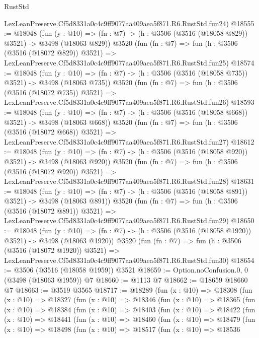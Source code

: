 \begin{lexlean}{RustStd}
\begin{coremodule}
    LexLeanPreserve.Cf5d8331a0c4c9ff9077aa409aea5f871.R6.RustStd.fun24)
@18555 := @18048
    (fun (y : @10) => (fn : @7) -> (h : @3506 (@3516 (@18058 @829)) @3521) -> @3498 (@18063 @829))
    @3520
    (fun (fn : @7) =>
    fun (h : @3506 (@3516 (@18072 @829)) @3521) =>
    LexLeanPreserve.Cf5d8331a0c4c9ff9077aa409aea5f871.R6.RustStd.fun25)
@18574 := @18048
    (fun (y : @10) => (fn : @7) -> (h : @3506 (@3516 (@18058 @735)) @3521) -> @3498 (@18063 @735))
    @3520
    (fun (fn : @7) =>
    fun (h : @3506 (@3516 (@18072 @735)) @3521) =>
    LexLeanPreserve.Cf5d8331a0c4c9ff9077aa409aea5f871.R6.RustStd.fun26)
@18593 := @18048
    (fun (y : @10) => (fn : @7) -> (h : @3506 (@3516 (@18058 @668)) @3521) -> @3498 (@18063 @668))
    @3520
    (fun (fn : @7) =>
    fun (h : @3506 (@3516 (@18072 @668)) @3521) =>
    LexLeanPreserve.Cf5d8331a0c4c9ff9077aa409aea5f871.R6.RustStd.fun27)
@18612 := @18048
    (fun (y : @10) => (fn : @7) -> (h : @3506 (@3516 (@18058 @920)) @3521) -> @3498 (@18063 @920))
    @3520
    (fun (fn : @7) =>
    fun (h : @3506 (@3516 (@18072 @920)) @3521) =>
    LexLeanPreserve.Cf5d8331a0c4c9ff9077aa409aea5f871.R6.RustStd.fun28)
@18631 := @18048
    (fun (y : @10) => (fn : @7) -> (h : @3506 (@3516 (@18058 @891)) @3521) -> @3498 (@18063 @891))
    @3520
    (fun (fn : @7) =>
    fun (h : @3506 (@3516 (@18072 @891)) @3521) =>
    LexLeanPreserve.Cf5d8331a0c4c9ff9077aa409aea5f871.R6.RustStd.fun29)
@18650 := @18048
    (fun (y : @10) => (fn : @7) -> (h : @3506 (@3516 (@18058 @1920)) @3521) -> @3498 (@18063 @1920))
    @3520
    (fun (fn : @7) =>
    fun (h : @3506 (@3516 (@18072 @1920)) @3521) =>
    LexLeanPreserve.Cf5d8331a0c4c9ff9077aa409aea5f871.R6.RustStd.fun30)
@18654 := @3506 (@3516 (@18058 @1959)) @3521
@18659 := Option.noConfusion.{0, 0} (@3498 (@18063 @1959)) @7
@18660 := @1113 @7
@18662 := @18659 @18660 @7
@18663 := @3519 @3565
@18717 := @18289
    (fun (x : @10) =>
    @18308
      (fun (x : @10) =>
      @18327
        (fun (x : @10) =>
        @18346
          (fun (x : @10) =>
          @18365
            (fun (x : @10) =>
            @18384
              (fun (x : @10) =>
              @18403
                (fun (x : @10) =>
                @18422
                  (fun (x : @10) =>
                  @18441
                    (fun (x : @10) =>
                    @18460
                      (fun (x : @10) =>
                      @18479
                        (fun (x : @10) =>
                        @18498
                          (fun (x : @10) =>
                          @18517
                            (fun (x : @10) =>
                            @18536

\end{coremodule}
\end{lexlean}

